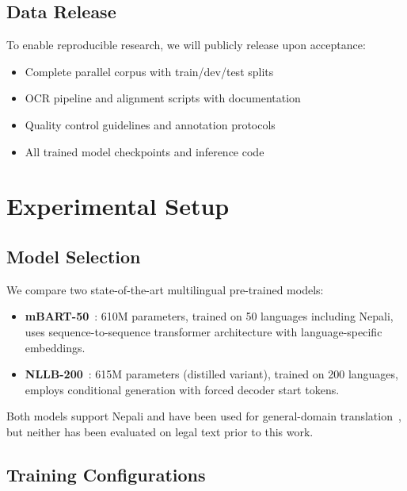 \documentclass[manuscript, screen, review]{acmart}
\begin{document}
\subsection{Data Release}
\label{subsec:data_release}

To enable reproducible research, we will publicly release upon acceptance:

\begin{itemize}
\item Complete parallel corpus with train/dev/test splits
\item OCR pipeline and alignment scripts with documentation
\item Quality control guidelines and annotation protocols
\item All trained model checkpoints and inference code
\end{itemize}

\section{Experimental Setup}
\label{sec:experimental}

\subsection{Model Selection}
\label{subsec:models}

We compare two state-of-the-art multilingual pre-trained models:

\begin{itemize}
\item \textbf{mBART-50}~\cite{liu2020multilingual}: 610M parameters, trained on 50 languages including Nepali, uses sequence-to-sequence transformer architecture with language-specific embeddings.

\item \textbf{NLLB-200}~\cite{nllb2022}: 615M parameters (distilled variant), trained on 200 languages, employs conditional generation with forced decoder start tokens.
\end{itemize}

Both models support Nepali and have been used for general-domain translation~\cite{khatri2020nepali}, but neither has been evaluated on legal text prior to this work.

\subsection{Training Configurations}
\label{subsec:configs}
\end{document}
